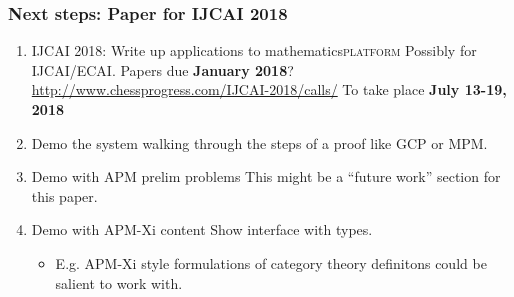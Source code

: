 \documentclass[11pt]{article}
\begin{document}
\subsubsection{Next steps: Paper for IJCAI 2018}
\label{sec:org3f11903}
\begin{enumerate}
\item IJCAI 2018: Write up applications to mathematics\hfill{}\textsc{platform}
\label{sec:org5a8ff6a}
Possibly for IJCAI/ECAI.
Papers due \textbf{January 2018}? \url{http://www.chessprogress.com/IJCAI-2018/calls/}
To take place \textbf{July 13-19, 2018}
\item Demo the system walking through the steps of a proof like GCP or MPM.
\label{sec:org5fb155c}
\item Demo with APM prelim problems
\label{sec:orgb48d2a8}
This might be a ``future work'' section for this paper.
\item Demo with APM-Xi content
\label{sec:orgcbf9a30}
Show interface with types.
\begin{itemize}
\item E.g. APM-Xi style formulations of category theory definitons could be salient to work with.
\end{itemize}
\end{enumerate}
\end{document}
